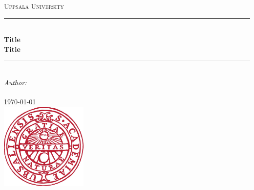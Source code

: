\documentclass[11pt]{article}
\begin{document}
\begin{titlepage}

\newcommand{\HRule}{\rule{\linewidth}{0.5mm}} %

\begin{center}
\textsc{\LARGE Uppsala University}\\[1.5cm] %

\HRule \\[0.4cm]
{ \huge \bfseries Title\\Title}\\[0.4cm] %
\HRule \\[1.5cm]
 
\large\emph{Author:}\\ \\[1.0cm]


{\large \today}\\[1cm] %

\includegraphics[width=1.7in]{Images/uulogga.png}\\%
\end{center}
\end{titlepage}
\pagebreak
\tableofcontents
\pagebreak





\printbibliography[title={References}, heading=bibnumbered]
\end{document}
